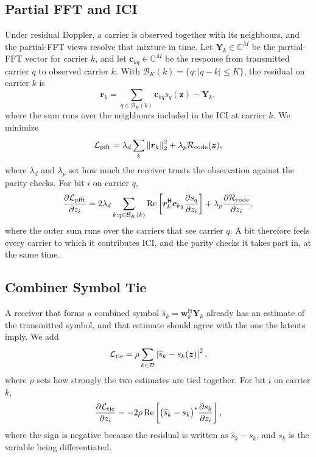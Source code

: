 \documentclass[11pt]{article}
\newcommand{\C}{\mathbb C}
\newcommand{\Hh}{^{\mathsf H}}
\newcommand{\norm}[1]{\left\lVert #1 \right\rVert}
\newcommand{\abs}[1]{\left\lvert #1 \right\rvert}
\newcommand{\Ree}{\operatorname{Re}}
\begin{document}
\subsection{Partial FFT and ICI}

Under residual Doppler, a carrier is observed together with its neighbours, and
the partial-FFT views resolve that mixture in time.  Let $\bm Y_k\in\C^M$ be the
partial-FFT vector for carrier $k$, and let $\bm c_{kq}\in\C^M$ be the response
from transmitted carrier $q$ to observed carrier $k$.  With
$\mathcal B_K(k)=\{q:\abs{q-k}\le K\}$, the residual on carrier $k$ is
\begin{equation}
  \bm r_k
  =
  \sum_{q\in\mathcal B_K(k)}\bm c_{kq}s_q(\bm z)-\bm Y_k,
\end{equation}
where the sum runs over the neighbours included in the ICI at carrier
$k$.  We minimize
\begin{equation}
  \mathcal L_{\rm pfft}
  =
  \lambda_d\sum_k\norm{\bm r_k}_2^2
  +\lambda_p\mathcal R_{\rm code}(\bm z),
\end{equation}
where $\lambda_d$ and $\lambda_p$ set how much the receiver trusts the
observation against the parity checks.  For bit $i$ on carrier $q$,
\begin{equation}
  \frac{\partial \mathcal L_{\rm pfft}}{\partial z_i}
  =
  2\lambda_d
  \sum_{k:q\in\mathcal B_K(k)}
  \Ree\left[
    \bm r_k\Hh\bm c_{kq}\frac{\partial s_q}{\partial z_i}
  \right]
  +\lambda_p
  \frac{\partial\mathcal R_{\rm code}}{\partial z_i},
  \label{eq:pfft_gradient}
\end{equation}
where the outer sum runs over the carriers that see carrier $q$.  A bit
therefore feels every carrier to which it contributes ICI, and the parity checks it takes part
in, at the same time.

\subsection{Combiner Symbol Tie}

A receiver that forms a combined symbol $\widehat s_k=\bm w_k\Hh\bm Y_k$ already
has an estimate of the transmitted symbol, and that estimate should agree with
the one the latents imply.  We add
\begin{equation}
  \mathcal L_{\rm tie}
  =
  \rho\sum_{k\in\mathcal D}\abs{\widehat s_k-s_k(\bm z)}^2 ,
\end{equation}
where $\rho$ sets how strongly the two estimates are tied together.  For bit $i$
on carrier $k$,
\begin{equation}
  \frac{\partial \mathcal L_{\rm tie}}{\partial z_i}
  =
  -2\rho\Ree\left[
    \big(\widehat s_k-s_k\big)^*
    \frac{\partial s_k}{\partial z_i}
  \right],
  \label{eq:tie_gradient}
\end{equation}
where the sign is negative because the residual is written as
$\widehat s_k-s_k$, and $s_k$ is the variable being differentiated.
\end{document}
